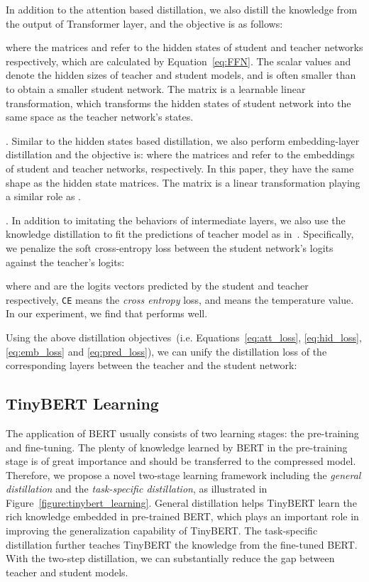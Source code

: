 \documentclass[11pt,a4paper]{article}
\newcommand{\comments}[1]{}
\begin{document}
In addition to the attention based distillation, we also distill the knowledge from the output of Transformer layer, and the objective is as follows:

where the matrices  and  refer to the hidden states of student and teacher networks respectively, which are calculated by Equation~\ref{eq:FFN}. The scalar values  and  denote the hidden sizes of teacher and student models, and  is often smaller than  to obtain a smaller student network. The matrix  is a learnable linear transformation, which transforms the hidden states of student network into the same space as the teacher network's states. 

. Similar to the hidden states based distillation, we also perform embedding-layer distillation and the objective is:
 where the matrices  and  refer to the embeddings of student and teacher networks, respectively. In this paper, they have the same shape as the hidden state matrices. The matrix  is a linear transformation playing a similar role as .
 
\comments{Following the teacher BERT's setting, we make the hidden size equal to the embedding size in student TinyBERT. Thus  have the same shapes with  respectively, and the learnable parameters  has the same shape with .} 

. In addition to imitating the behaviors of intermediate layers, we also use the knowledge distillation to fit the predictions of teacher model as in~\citet{hinton2015distilling}. Specifically, we penalize the soft cross-entropy loss between the student network's logits against the teacher's logits:

where  and  are the logits vectors predicted by the student and teacher respectively, \texttt{CE} means the \textit{cross entropy} loss, and  means the temperature value. In our experiment, we find that  performs well.


Using the above distillation objectives~(i.e. Equations~\ref{eq:att_loss}, \ref{eq:hid_loss}, \ref{eq:emb_loss} and \ref{eq:pred_loss}), we can unify the distillation loss of the corresponding layers between the teacher and the student network:

\subsection{TinyBERT Learning}
The application of BERT usually consists of two learning stages: the pre-training and fine-tuning. The plenty of knowledge learned by BERT in the pre-training stage is of great importance and should be transferred to the compressed model. Therefore, we propose a novel two-stage learning framework including the {\it general distillation} and the {\it task-specific distillation}, as illustrated in Figure~\ref{figure:tinybert_learning}. General distillation helps TinyBERT learn the rich knowledge embedded in pre-trained BERT, which plays an important role in improving the generalization capability of TinyBERT. The task-specific distillation further teaches TinyBERT the knowledge from the fine-tuned BERT. With the two-step distillation, we can substantially reduce the gap between teacher and student models. 
\end{document}
